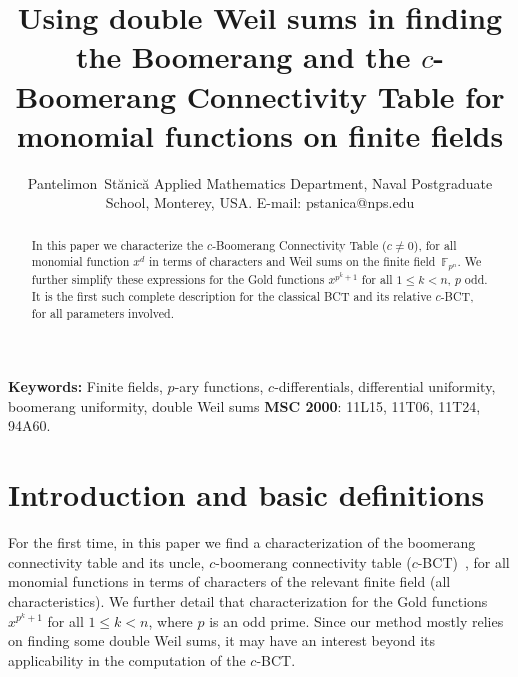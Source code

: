 \documentclass[11pt]{article}
\def\F{{\mathbb F}}
\def\\{\cr}
\begin{document}
\title{\bf Using double Weil sums in finding the Boomerang and the $c$-Boomerang Connectivity Table for monomial functions on finite fields}
\author{Pantelimon~St\u anic\u a  \\ %
Applied Mathematics Department, \\
Naval Postgraduate School, Monterey, USA. \\
E-mail: pstanica@nps.edu}

 \maketitle 

\begin{abstract}
In this paper we characterize the  $c$-Boomerang Connectivity Table ($c\neq 0$), for all monomial function $x^d$ in terms of characters and Weil sums on the finite field~$\F_{p^n}$. We further simplify these expressions for the Gold functions $x^{p^k+1}$ for all $1\leq k<n$, $p$ odd. It is the first such complete description  for the classical BCT and its relative $c$-BCT, for all parameters involved.
\end{abstract}

{\bf Keywords:} 
Finite fields,
$p$-ary functions, 
$c$-differentials,  
differential uniformity,
boomerang uniformity,
double Weil sums
\newline
{\bf MSC 2000}: 11L15, 11T06, 11T24, 94A60.
 

\section{Introduction and basic definitions}


For the first time, in this paper we find a characterization of the boomerang connectivity table and its uncle, $c$-boomerang connectivity table ($c$-BCT)~\cite{S20}, for all monomial functions in terms of characters of the relevant finite field (all characteristics). We further detail that characterization for the Gold functions $x^{p^k+1}$ for all $1\leq k<n$, where $p$ is an odd prime.  Since our method mostly relies on finding some double Weil sums, it may have an interest beyond its applicability in the computation of the $c$-BCT.
   
\end{document}
